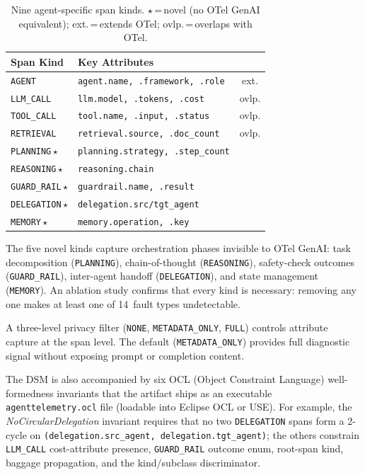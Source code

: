 \documentclass[sigconf,review]{acmart}
\begin{document}
\begin{table}[t]
\centering
\small
\caption{Nine agent-specific span kinds.
$\star$\,=\,novel (no OTel GenAI equivalent);
ext.\,=\,extends OTel; ovlp.\,=\,overlaps with OTel.}
\label{tab:spans}
\begin{tabular}{@{}llc@{}}
\toprule
\textbf{Span Kind} & \textbf{Key Attributes} & \\
\midrule
\texttt{AGENT}      & \texttt{agent.name, .framework, .role} & ext. \\
\texttt{LLM\_CALL}  & \texttt{llm.model, .tokens, .cost}     & ovlp. \\
\texttt{TOOL\_CALL} & \texttt{tool.name, .input, .status}    & ovlp. \\
\texttt{RETRIEVAL}  & \texttt{retrieval.source, .doc\_count}  & ovlp. \\
\texttt{PLANNING}\,$\star$   & \texttt{planning.strategy, .step\_count} & \\
\texttt{REASONING}\,$\star$  & \texttt{reasoning.chain}               & \\
\texttt{GUARD\_RAIL}\,$\star$& \texttt{guardrail.name, .result}       & \\
\texttt{DELEGATION}\,$\star$ & \texttt{delegation.src/tgt\_agent}     & \\
\texttt{MEMORY}\,$\star$     & \texttt{memory.operation, .key}        & \\
\bottomrule
\end{tabular}
\end{table}

The five novel kinds capture orchestration phases invisible to
OTel GenAI: task decomposition (\texttt{PLANNING}), chain-of-thought
(\texttt{REASONING}), safety-check outcomes (\texttt{GUARD\_\allowbreak{}RAIL}),
inter-agent handoff (\texttt{DELE\-GATION}), and state management
(\texttt{MEMORY}).
An ablation study confirms that every kind is necessary: removing
any one makes at least one of 14~fault types undetectable.

A three-level privacy filter (\texttt{NONE},
\texttt{METADATA\_\allowbreak{}ONLY}, \texttt{FULL}) controls
attribute capture at the span level.  The default
(\texttt{METADATA\_ONLY}) provides full diagnostic signal without
exposing prompt or completion content.

The DSM is also accompanied by six OCL (Object Constraint Language) well-formedness invariants
that the artifact ships as an executable
\texttt{agenttelemetry.ocl} file (loadable into Eclipse OCL or USE).
For example, the \emph{NoCircularDelegation} invariant requires
that no two \texttt{DELEGATION} spans form a 2-cycle on
\texttt{(delegation.src\_agent, delegation.tgt\_agent)};
the others constrain \texttt{LLM\_CALL} cost-attribute presence,
\texttt{GUARD\_RAIL} outcome enum, root-span kind, baggage propagation,
and the kind/subclass discriminator.
\end{document}
